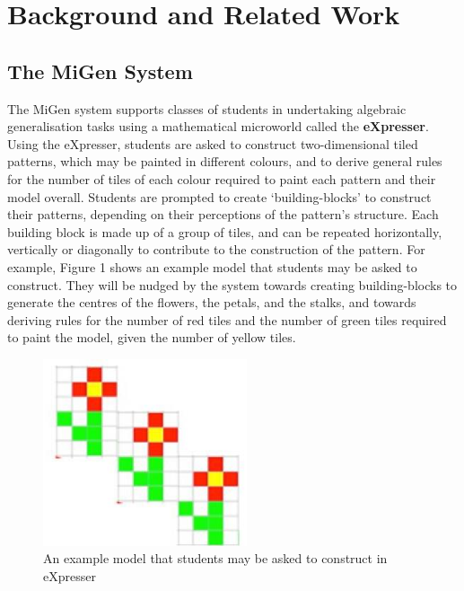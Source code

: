 
\section{Background and Related Work}
\label{sec:backgr-relat-work}


\subsection{The MiGen System}
\label{sec:migen-system}

The MiGen system supports classes of students in undertaking algebraic
generalisation tasks using a mathematical microworld called the 
{\bf eXpresser}. Using the eXpresser, students are asked to construct
two-dimensional tiled patterns, which may be painted in different
colours, and to derive general rules for the number of tiles of each
colour required to paint each pattern and their model
overall. Students are prompted to create `building-blocks' to
construct their patterns, depending on their perceptions of the
pattern’s structure. Each building block is made up of a group of
tiles, and can be repeated horizontally, vertically or diagonally to
contribute to the construction of the pattern. For example, Figure 1
shows an example model that students may be asked to construct. They
will be nudged by the system towards creating building-blocks to
generate the centres of the flowers, the petals, and the stalks, and
towards deriving rules for the number of red tiles and the number of
green tiles required to paint the model, given the number of yellow
tiles.

\begin{figure}[htbp]
  \centering
  \includegraphics[width=6cm]{gfx/example.eps}
  \caption{An example model that students may be asked to construct in eXpresser}
  \label{fig:example}
\end{figure}



